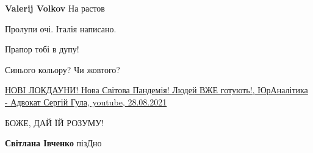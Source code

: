 \begin{itemize}
\begin{itemize}
\textbf{Valerij Volkov} На растов

 
Пролупи очі.
Італія написано.
\end{itemize}

 
Прапор тобі в дупу!

\begin{itemize}
 
Синього кольору?
Чи жовтого?
\end{itemize}

 
\href{https://youtu.be/nVaRQlgTcpk}{%
НОВІ ЛОКДАУНИ! Нова Світова Пандемія! Людей ВЖЕ готують!, %
ЮрАналітика - Адвокат Сергій Гула, youtube, 28.08.2021%
}

 
БОЖЕ, ДАЙ ЇЙ РОЗУМУ! 🙏🙏🙏

\begin{itemize}
 
\textbf{Світлана Івченко} пізДно
\end{itemize}


\end{itemize}
